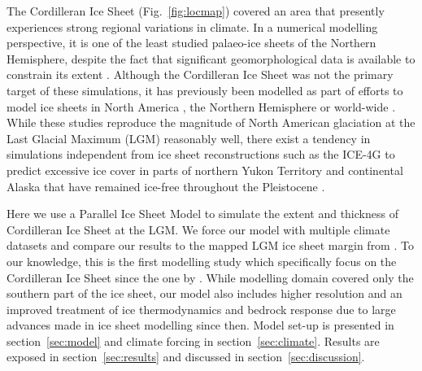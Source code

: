 The Cordilleran Ice Sheet (Fig.~\ref{fig:locmap}) covered an area that presently experiences strong regional variations in climate. In a numerical modelling perspective, it is one of the least studied palaeo-ice sheets of the Northern Hemisphere, despite the fact that significant geomorphological data is available to constrain its extent \citep{jackson-clague-1991,dukrodkin-1999,kaufman-manley-2004,kleman-etal-2010,margold-etal-2011}. Although the Cordilleran Ice Sheet was not the primary target of these simulations, it has previously been modelled as part of efforts to model ice sheets in North America \citep{marshall-clarke-1999,calov-etal-2002,tarasov-peltier-1997,tarasov-peltier-2004,gregoire-etal-2012}, the Northern Hemisphere \citep{huybrechts-tsiobbel-1996,greve-etal-1999,charbit-etal-2002,charbit-etal-2007,charbit-etal-2013,johnson-fastook-2002,rodgers-etal-2004,bintanja-etal-2005,zweck-huybrechts-2005,abeouchi-etal-2007} or world-wide \citep{yoshimori-etal-2001}. While these studies reproduce the magnitude of North American glaciation at the Last Glacial Maximum (LGM) reasonably well, there exist a tendency in simulations independent from ice sheet reconstructions such as the ICE-4G to predict excessive ice cover in parts of northern Yukon Territory and continental Alaska that have remained ice-free throughout the Pleistocene \citep{dukrodkin-1999,kaufman-manley-2004}.

Here we use a Parallel Ice Sheet Model \citep[PISM,][]{web:pism}  to simulate the extent and thickness of Cordilleran Ice Sheet at the LGM. We force our model with multiple climate datasets and compare our results to the mapped LGM ice sheet margin from \citet{dyke-2004}. To our knowledge, this is the first modelling study which specifically focus on the Cordilleran Ice Sheet since the one by \citet{robert-1991}. While \citet{robert-1991} modelling domain covered only the southern part of the ice sheet, our model also includes higher resolution and an improved treatment of ice thermodynamics and bedrock response due to large advances made in ice sheet modelling since then. Model set-up is presented in section~\ref{sec:model} and climate forcing in section~\ref{sec:climate}. Results are exposed in section~\ref{sec:results} and discussed in section~\ref{sec:discussion}.
